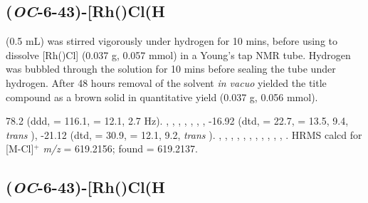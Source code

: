 
\subsection*{(\emph{OC}-6-43)-\texorpdfstring{[Rh(\tBusixantphosk)Cl(H\ce{)2]}}R}


 (0.5 mL) was stirred vigorously under hydrogen for 10 mins, before using to dissolve [Rh(\tBusixantphos)Cl] (0.037 g, 0.057 mmol) in a Young's tap NMR tube.  Hydrogen was bubbled through the solution for 10 mins before sealing the tube under hydrogen.  After 48 hours removal of the solvent \emph{in vacuo} yielded the title compound as a brown solid in quantitative yield (0.037 g, 0.056 mmol).  

78.2 (ddd, \JRhP{} = 116.1, \JPH{} = 12.1, 2.7 Hz).
,
,
,
,
,
,
,
-16.92 (dtd, \JRhH{} = 22.7, \JPH{} = 13.5, \JHH{} 9.4,  \emph{trans} ),
-21.12 (dtd, \JRhH{} = 30.9, \JPH{} = 12.1, \JHH{} 9.2,  \emph{trans} ).
,
,
,
,
,
,
,
,
,
,
,
.
HRMS calcd for  [M-Cl]$^+$ \emph{m/z} = 619.2156; found = 619.2137.


\subsection*{(\emph{OC}-6-43)-\texorpdfstring{[Rh(\tButhixantphosk)Cl(H\ce{)2]}} R}

